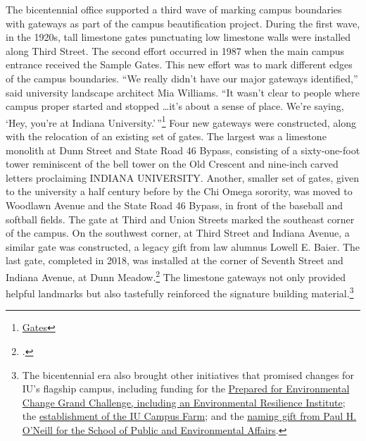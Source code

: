 \documentclass[
  american,
  letterpaper,
]{scrreprt}
\begin{document}
The bicentennial office supported a third wave of marking campus
boundaries with gateways as part of the campus beautification project.
During the first wave, in the 1920s, tall limestone gates punctuating
low limestone walls were installed along Third Street. The second effort
occurred in 1987 when the main campus entrance received the Sample
Gates. This new effort was to mark different edges of the campus
boundaries. ``We really didn't have our major gateways identified,''
said university landscape architect Mia Williams. ``It wasn't clear to
people where campus proper started and stopped \ldots it's about a sense
of place. We're saying, `Hey, you're at Indiana
University.'\,''\footnote{\href{https://web.archive.org/web/20201014090439/https://200.iu.edu/signature-projects/heritage-art-campus/campus-beautification/gates.html}{Gates}}
Four new gateways were constructed, along with the relocation of an
existing set of gates. The largest was a limestone monolith at Dunn
Street and State Road 46 Bypass, consisting of a sixty-one-foot tower
reminiscent of the bell tower on the Old Crescent and nine-inch carved
letters proclaiming INDIANA UNIVERSITY. Another, smaller set of gates,
given to the university a half century before by the Chi Omega sorority,
was moved to Woodlawn Avenue and the State Road 46 Bypass, in front of
the baseball and softball fields. The gate at Third and Union Streets
marked the southeast corner of the campus. On the southwest corner, at
Third Street and Indiana Avenue, a similar gate was constructed, a
legacy gift from law alumnus Lowell E. Baier. The last gate, completed
in 2018, was installed at the corner of Seventh Street and Indiana
Avenue, at Dunn Meadow.\footnote{.}
The limestone gateways not only provided helpful landmarks but also
tastefully reinforced the signature building material.\footnote{The
  bicentennial era also brought other initiatives that promised changes
  for IU's flagship campus, including funding for the
  \href{https://news.iu.edu/stories/2017/05/iu/releases/10-grand-challenges.html}{Prepared
  for Environmental Change Grand Challenge, including an Environmental
  Resilience Institute}; the
  \href{https://news.iu.edu/stories/2017/10/iub/inside/31-campus-farm.html}{establishment
  of the IU Campus Farm}; and the
  \href{https://news.iu.edu/stories/2019/03/iu/releases/04-school-of-public-and-environmental-affairs-named-for-paul-oneill.html}{naming
  gift from Paul H. O'Neill for the School of Public and Environmental
  Affairs}.}
\end{document}
